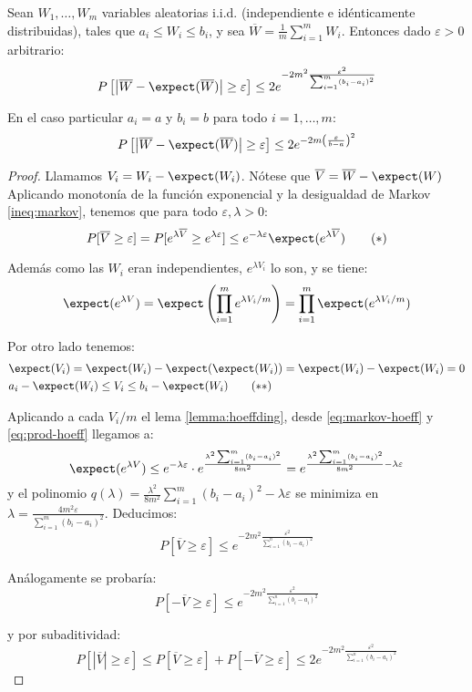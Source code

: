 \begin{lemma}
 Sean $W_1, \ldots, W_m$ variables aleatorias i.i.d. (independiente e idénticamente distribuidas), tales que 
 $a_i \le W_i \le b_i$, y sea $\overline{W} = \frac{1}{m} \sum_{i=1}^m W_i$. Entonces dado $\varepsilon > 0$ arbitrario:
 \[
   P\left[\left| \overline{W} - \expect(\overline{W}) \right| \ge \varepsilon \right] \le 2e^{-2m^2 \frac{\varepsilon^2}{\sum_{i=1}^m (b_i-a_i)^2}}
 \]
 
 En el caso particular $a_i = a$ y $b_i = b$ para todo $i=1, \ldots, m$:
 \[
   P\left[\left| \overline{W} - \expect(\overline{W}) \right| \ge \varepsilon \right] \le 2e^{-2m \left(\frac{\varepsilon}{b-a}\right)^2}
 \] 
 \label{ineq:hoeffding}
\end{lemma}

\begin{proof}
 Llamamos $V_i = W_i - \expect(W_i)$. Nótese que $\overline{V} = \overline{W} - \expect(W)$
 Aplicando monotonía de la función exponencial y la desigualdad de Markov \ref{ineq:markov}, tenemos que 
 para todo $\varepsilon, \lambda > 0$:
 \begin{equation}
 P[\overline{V} \ge \varepsilon] = P[e^{\lambda\overline{V}} \ge e^{\lambda \varepsilon}]
 \le e^{-\lambda \varepsilon} \expect(e^{\lambda \overline{V}})
 \label{eq:markov-hoeff}\tag{$\ast$}
 \end{equation}
 
 Además como las $W_i$ eran independientes, $e^{\lambda V_i}$ lo son, y se tiene:
 \[
   \expect(e^{\lambda V}) = \expect\left(\prod_{i=1}^m e^{\lambda V_i / m}\right) = \prod_{i=1}^m \expect(e^{\lambda V_i/m})
 \]
 
 Por otro lado tenemos:
 \begin{align}
  & \expect(V_i) = \expect(W_i) - \expect(\expect(W_i)) = \expect(W_i) - \expect(W_i) = 0 \nonumber \\
  & a_i-\expect(W_i) \le V_i \le b_i-\expect(W_i)
  \label{eq:prod-hoeff}\tag{$\ast$$\ast$}
 \end{align}
 
 Aplicando a cada $V_i/m$ el lema \ref{lemma:hoeffding}, desde \eqref{eq:markov-hoeff} y \eqref{eq:prod-hoeff} 
 llegamos a:
 \[
   \expect(e^{\lambda V}) \le e^{-\lambda \varepsilon} \cdot e^{\frac{\lambda^2 \sum_{i=1}^m(b_i-a_i)^2}{8m^2}} = 
   e^{\frac{\lambda^2 \sum_{i=1}^m(b_i-a_i)^2}{8m^2} - \lambda\varepsilon}
 \]
 y el polinomio $q(\lambda)= \frac{\lambda^2}{8m^2} \sum_{i=1}^m(b_i-a_i)^2 - \lambda\varepsilon$ se minimiza en 
 $\lambda = \frac{4m^2\varepsilon}{\sum_{i=1}^m(b_i-a_i)^2}$. Deducimos:
 \[
   P[\overline{V} \ge \varepsilon] \le e^{-2m^2 \frac{\varepsilon^2}{\sum_{i=1}^n (b_i-a_i)^2}}
 \]
 
 Análogamente se probaría:
 \[
   P[-\overline{V} \ge \varepsilon] \le e^{-2m^2 \frac{\varepsilon^2}{\sum_{i=1}^n (b_i-a_i)^2}}
 \]
 
 y por subaditividad: 
 \[
   P[|\overline{V}| \ge \varepsilon] \le P[\overline{V} \ge \varepsilon] + P[-\overline{V} \ge \varepsilon]
   \le 2e^{-2m^2 \frac{\varepsilon^2}{\sum_{i=1}^n (b_i-a_i)^2}}
 \]
 
\end{proof}
